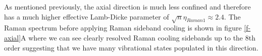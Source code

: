 \documentclass[aps,prl,twocolumn,groupedaddress]{revtex4-1}
\begin{document}
As mentioned previously, the axial direction is much less confined and therefore has a much higher
effective Lamb-Dicke parameter of $\sqrt{n}\eta_{Raman1}\approx2.4$. The Raman spectrum before applying Raman sideband cooling is shown in figure \ref{f-axial}A where we can see clearly resolved Raman cooling sidebands up to the 8th order suggesting that we have many vibrational states populated in this direction.\\

\ \\
\ \\
\ \\
\ \\
\ \\
\ \\
\ \\
\ \\
\ \\
\ \\
\ \\
\ \\
\ \\
\ \\
\ \\
\ \\
\ \\
\ \\
\ \\
\ \\
\ \\
\ \\
\ \\
\ \\
\ \\
\ \\
\ \\
\ \\
\ \\
\ \\
\ \\
\ \\
\ \\
\ \\
\ \\
\ \\
\ \\
\ \\
\ \\
\ \\
\ \\
\ \\
\ \\
\ \\
\ \\
\ \\
\ \\
\end{document}
